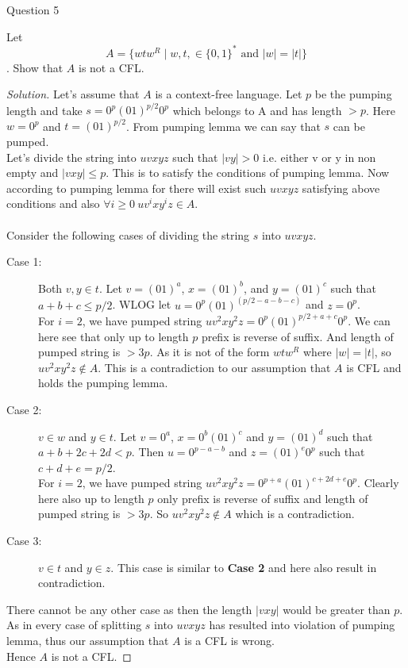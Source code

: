 \begin{solution}{Question 5}\label{ques:5}
    \begin{question}
     Let $$A = \{wtw^R\mid w,t, \in \{0,1\}^* \text{ \ and \ } |w| = |t|\}$$. Show that $A$ is not a CFL.
    \end{question}
    \tcblower{}
    \begin{proof}[Solution]
        Let's assume that $A$ is a context-free language. Let $p$ be the pumping length and take $s = 0^p(01)^{p/2}0^p$ which belongs to A and has length $> p$. Here $w = 0^p$ and $t = (01)^{p/2}$. From pumping lemma we can say that $s$ can be pumped.\\
        Let's divide the string into $uvxyz$ such that $|vy| > 0$ i.e. either v or y in non empty and $|vxy| \leq p$. This is to satisfy the conditions of pumping lemma. Now according to pumping lemma for there will exist such $uvxyz$ satisfying above conditions and also $\forall i \geq 0\ uv^ixy^iz \in A$.\\
        \\
        Consider the following cases of dividing the string $s$ into $uvxyz$.
        \begin{description}
            \item[Case 1:] Both $v, y \in t$. Let $v = (01)^a$, $x = (01)^b$, and $y = (01)^c$ such that $a+b+c \leq p/2$. WLOG let $u = 0^p(01)^{(p/2-a-b-c)}$ and $z = 0^p$.\\
            For $i = 2$, we have pumped string $uv^2xy^2z = 0^p(01)^{p/2+a+c}0^p$. We can here see that only up to length $p$ prefix is reverse of suffix. And length of pumped string is $> 3p$. As it is not of the form $wtw^R$ where $|w| = |t|$, so $uv^2xy^2z \notin A$. This is a contradiction to our assumption that $A$ is CFL and holds the pumping lemma.
            
            \item[Case 2:] $v \in w$ and $y \in t$. Let $v = 0^a$, $x = 0^b(01)^c$ and $y = (01)^d$ such that $a + b + 2c + 2d < p$. Then $u = 0^{p-a-b}$ and $z = (01)^e0^p$ such that $c + d + e = p/2$.\\
            For $i = 2$, we have pumped string $uv^2xy^2z = 0^{p+a}(01)^{c+2d+e}0^p$. Clearly here also up to length $p$ only prefix is reverse of suffix and length of pumped string is $ > 3p$. So $uv^2xy^2z \notin A$ which is a contradiction.
            
            \item[Case 3:] $v \in t$ and $y \in z$. This case is similar to \textbf{Case 2} and here also result in contradiction.
        \end{description}
        There cannot be any other case as then the length $|vxy|$ would be greater than $p$.\\
        
        As in every case of splitting $s$ into $uvxyz$ has resulted into violation of pumping lemma, thus our assumption that $A$ is a CFL is wrong. \\
        
        Hence $A$ is not a CFL.
    \end{proof}
\end{solution}
